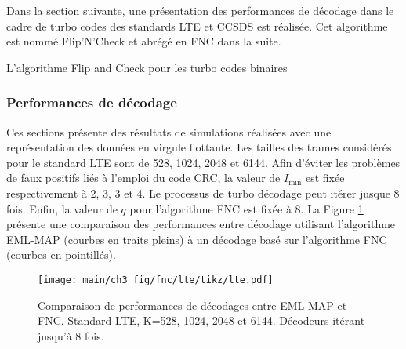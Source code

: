 Dans la section suivante, une présentation des performances de décodage dans le cadre de turbo codes des standards LTE
et CCSDS est réalisée. Cet algorithme est nommé Flip'N'Check et abrégé en FNC dans la suite.

\begin{center}
\begin{minipage}{.86\textwidth}%
\begin{algorithm}[H]
\label{alg:fc_b}
	\DontPrintSemicolon
	
	\;
	\caption{L'algorithme Flip and Check pour les turbo codes binaires}
\end{algorithm}
\end{minipage}
\end{center}



\subsubsection{Performances de décodage}
Ces sections présente des résultats de simulations réalisées avec une représentation des données en virgule flottante.
Les tailles des trames considérés pour le standard LTE sont de 528, 1024, 2048 et 6144. Afin d'éviter les problèmes de
faux positifs liés à l'emploi du code CRC, la valeur de $I_\text{min}$ est fixée respectivement à 2, 3, 3 et 4. Le processus
de turbo décodage peut itérer jusque 8 fois. Enfin, la valeur de $q$ pour l'algorithme FNC est fixée à 8. La Figure 
\ref{fig:fnc_lte} présente une comparaison des performances entre décodage utilisant l'algorithme EML-MAP (courbes en 
traits pleins) à un décodage basé sur l'algorithme FNC (courbes en pointillés).

\begin{figure}[!htb]
	\centering
	\texttt{[image: main/ch3\_fig/fnc/lte/tikz/lte.pdf]}
	\caption{Comparaison de performances de décodages entre EML-MAP et FNC. Standard LTE, K=528, 1024, 2048 et 6144.
	Décodeurs itérant jusqu'à 8 fois. \label{fig:fnc_lte}}
\end{figure}

